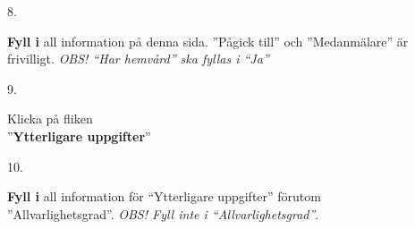 \documentclass[paper=a5,DIV=15,headinclude,twoside=semi,openany,titlepage=firstiscover]{scrbook}
\begin{document}
\noindent\hrulefill
\newpage
\noindent\hrulefill

\vfill
\noindent
\begin{minipage}[t]{0.06\textwidth}
	\phantom{1}8.
\end{minipage}%
\begin{minipage}[t]{.94\textwidth}
	\textbf{Fyll i} all information på denna sida. ”Pågick till” och ”Medanmälare” är frivilligt. \textit{OBS! ``Har hemvård'' ska fyllas i ``Ja''}
\end{minipage}%
\vfill

\noindent\hrulefill

\vfill
\noindent
\begin{minipage}[t]{0.06\textwidth}
	\phantom{1}9.
\end{minipage}%
\begin{minipage}[t]{.54\textwidth}
	Klicka på fliken\\”\textbf{Ytterligare uppgifter}”
\end{minipage}%
\begin{minipage}[t]{.4\textwidth}
	\hfill{}
\end{minipage}
\vfill

\noindent\hrulefill

\vfill
\noindent
\begin{minipage}[t]{0.06\textwidth}
	10.
\end{minipage}%
\begin{minipage}[t]{.94\textwidth}
	\textbf{Fyll i} all information för ``Ytterligare uppgifter'' förutom\\ ”Allvarlighetsgrad”. \textit{OBS! Fyll inte i ``Allvarlighetsgrad''}.
\end{minipage}%
\vfill
\end{document}
